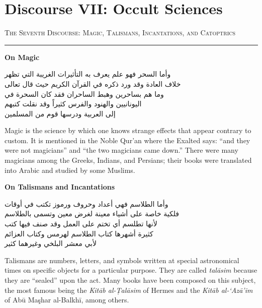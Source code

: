 \documentclass[11pt,a4paper]{article}
\newcommand{\ar}[1]{{\arabicfont\beginR #1\endR}}
\newcommand{\bilingual}[2]{%
  \noindent
  \begin{minipage}[t]{0.47\textwidth}
    \vspace{0pt}
    \begin{flushright}
    {\arabicfont\beginR #1\endR}
    \end{flushright}
  \end{minipage}%
  \hfill\vline\hfill
  \begin{minipage}[t]{0.47\textwidth}
    \vspace{0pt}
    #2
  \end{minipage}%
  \par\vspace{0.8em}
}
\newcommand{\bilingualsection}[2]{%
  \vspace{1em}%
  \noindent
  \begin{minipage}[t]{0.47\textwidth}
    \begin{flushright}
    \textsc{\color{sectioncolor}\ar{#1}}
    \end{flushright}
  \end{minipage}%
  \hfill
  \begin{minipage}[t]{0.47\textwidth}
    \textsc{\color{sectioncolor}#2}
  \end{minipage}%
  \par\vspace{0.5em}\hrule\vspace{0.8em}%
}
\newcommand{\bilingualsubsection}[2]{%
  \vspace{0.6em}%
  \noindent
  \begin{minipage}[t]{0.47\textwidth}
    \begin{flushright}
    \textbf{\color{sectioncolor}\ar{#1}}
    \end{flushright}
  \end{minipage}%
  \hfill
  \begin{minipage}[t]{0.47\textwidth}
    \textbf{\color{sectioncolor}#2}
  \end{minipage}%
  \par\vspace{0.4em}%
}
\begin{document}
\newpage

\section{Discourse VII: Occult Sciences}
\label{sec:VII}

\bilingualsection{الفن السابع في السحر والطلاسم والعزائم والكسوفات}{The Seventh Discourse: Magic, Talismans, Incantations, and Catoptrics}

\bilingualsubsection{في السحر}{On Magic}

\bilingual
{وأما السحر فهو علم يعرف به التأثيرات الغريبة التي تظهر\\
خلاف العادة وقد ورد ذكره في القرآن الكريم حيث قال تعالى\\
وما هم بساحرين وهبط الساحران فقد كان السحرة في\\
اليونانيين والهنود والفرس كثيراً وقد نقلت كتبهم\\
إلى العربية ودرسها قوم من المسلمين}
{Magic is the science by which one knows strange effects that appear
contrary to custom. It is mentioned in the Noble Qur'an where the
Exalted says: ``and they were not magicians'' and ``the two magicians
came down.'' There were many magicians among the Greeks, Indians, and
Persians; their books were translated into Arabic and studied by some
Muslims.}

\bilingualsubsection{في الطلاسم والعزائم}{On Talismans and Incantations}

\bilingual
{وأما الطلاسم فهي أعداد وحروف ورموز تكتب في أوقات\\
فلكية خاصة على أشياء معينة لغرض معين وتسمى بالطلاسم\\
لأنها تطلسم أي تختم على العمل وقد صنف فيها كتب\\
كثيرة أشهرها كتاب الطلاسم لهرمس وكتاب العزائم\\
لأبي معشر البلخي وغيرهما كثير}
{Talismans are numbers, letters, and symbols written at special
astronomical times on specific objects for a particular purpose. They
are called \textit{tal\=asim} because they are ``sealed'' upon the act.
Many books have been composed on this subject, the most famous being the
\textit{Kit\=ab al-\d{T}al\=asim} of Hermes and the \textit{Kit\=ab
al-\textquoteleft Az\=a'im} of Ab\=u Ma\c{sh}ar al-Balkh\=i, among others.}

\newpage
\end{document}
